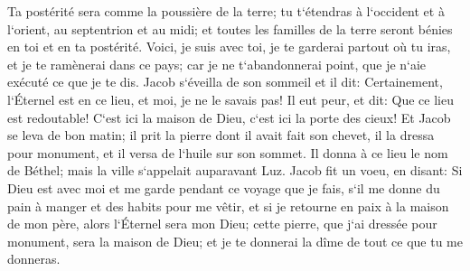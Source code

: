 \verse Ta postérité sera comme la poussière de la terre; tu t`étendras à l`occident et à l`orient, au septentrion et au midi; et toutes les familles de la terre seront bénies en toi et en ta postérité. 
\verse Voici, je suis avec toi, je te garderai partout où tu iras, et je te ramènerai dans ce pays; car je ne t`abandonnerai point, que je n`aie exécuté ce que je te dis. 
\verse Jacob s`éveilla de son sommeil et il dit: Certainement, l`Éternel est en ce lieu, et moi, je ne le savais pas! 
\verse Il eut peur, et dit: Que ce lieu est redoutable! C`est ici la maison de Dieu, c`est ici la porte des cieux! 
\verse Et Jacob se leva de bon matin; il prit la pierre dont il avait fait son chevet, il la dressa pour monument, et il versa de l`huile sur son sommet. 
\verse Il donna à ce lieu le nom de Béthel; mais la ville s`appelait auparavant Luz. 
\verse Jacob fit un voeu, en disant: Si Dieu est avec moi et me garde pendant ce voyage que je fais, s`il me donne du pain à manger et des habits pour me vêtir, 
\verse et si je retourne en paix à la maison de mon père, alors l`Éternel sera mon Dieu; 
\verse cette pierre, que j`ai dressée pour monument, sera la maison de Dieu; et je te donnerai la dîme de tout ce que tu me donneras. 

